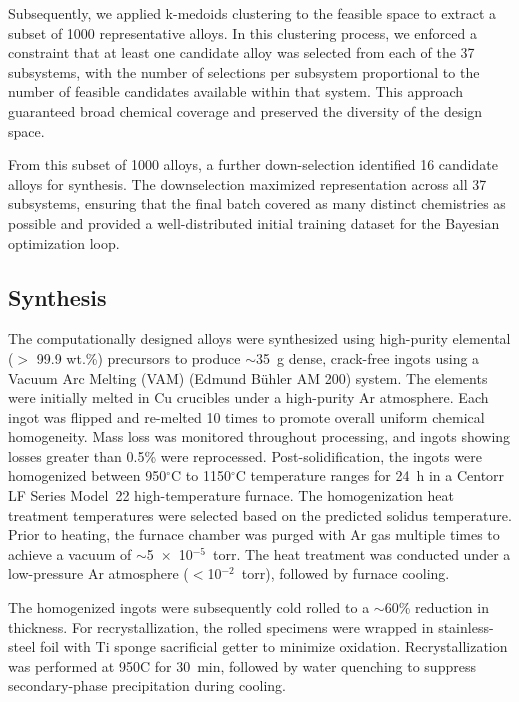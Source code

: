 Subsequently, we applied k-medoids clustering to the feasible space to extract a subset of 1000 representative alloys. In this clustering process, we enforced a constraint that at least one candidate alloy was selected from each of the 37 subsystems, with the number of selections per subsystem proportional to the number of feasible candidates available within that system. This approach guaranteed broad chemical coverage and preserved the diversity of the design space.

From this subset of 1000 alloys, a further down-selection identified 16 candidate alloys for synthesis. The downselection maximized representation across all 37 subsystems, ensuring that the final batch covered as many distinct chemistries as possible and provided a well-distributed initial training dataset for the Bayesian optimization loop.


\subsection{Synthesis}

The computationally designed alloys were synthesized using high-purity elemental ($>$ 99.9 wt.\%) precursors to produce $\sim$35~g dense, crack-free ingots using a Vacuum Arc Melting (VAM) (Edmund B\"{u}hler AM 200) system. The elements were initially melted in Cu crucibles under a high-purity Ar atmosphere. Each ingot was flipped and re-melted 10 times to promote overall uniform chemical homogeneity. Mass loss was monitored throughout processing, and ingots showing losses greater than 0.5\% were reprocessed. Post-solidification, the ingots were homogenized between 950$^\circ$C to 1150$^\circ$C temperature ranges for 24~h in a Centorr LF Series Model~22 high-temperature furnace. The homogenization heat treatment temperatures were selected based on the predicted solidus temperature. Prior to heating, the furnace chamber was purged with Ar gas multiple times to achieve a vacuum of $\sim$5~$\times$~10$^{-5}$~torr. The heat treatment was conducted under a low-pressure Ar atmosphere ($<$10$^{-2}$~torr), followed by furnace cooling.

The homogenized ingots were subsequently cold rolled to a $\sim$60\% reduction in thickness. For recrystallization, the rolled specimens were wrapped in stainless-steel foil with Ti sponge sacrificial getter to minimize oxidation. Recrystallization was performed at 950\textdegree C for 30~min, followed by water quenching to suppress secondary-phase precipitation during cooling.

